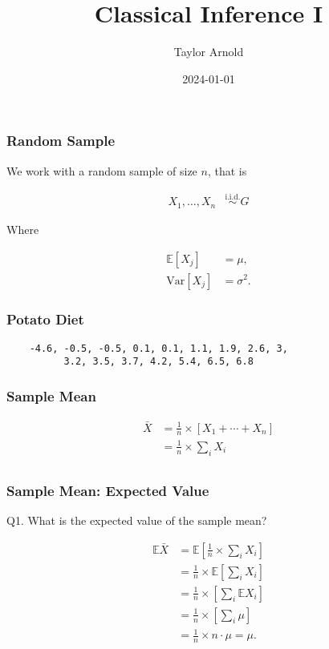 \documentclass{beamer}
\title{Classical Inference I}
\author{Taylor Arnold}
\date{2024-01-01}
\newcommand{\iid}{\overset{\mathrm{i.i.d.}}{\sim}}
\newcommand{\E}{\mathbb{E}}
\newcommand{\V}{\text{Var}}
\begin{document}
\frame{\titlepage}


\begin{frame}
\frametitle{Random Sample}

We work with a random sample of size $n$, that is

\begin{align*}
X_1, \ldots, X_n &\iid G
\end{align*}

Where 

\begin{align*}
\E \left[ X_j \right] &= \mu, \\
\V \left[ X_j \right] &= \sigma^2.
\end{align*}

\end{frame}

\begin{frame}[fragile]
\frametitle{Potato Diet}

\begin{verbatim}
    -4.6, -0.5, -0.5, 0.1, 0.1, 1.1, 1.9, 2.6, 3,
          3.2, 3.5, 3.7, 4.2, 5.4, 6.5, 6.8
\end{verbatim}

\end{frame}


\begin{frame}
\frametitle{Sample Mean}

\begin{align*}
\bar{X} &= \frac{1}{n} \times \left[X_1 + \cdots + X_n \right] \\
&= \frac{1}{n} \times \sum_i X_i \\
\end{align*}

\end{frame}


\begin{frame}
\frametitle{Sample Mean: Expected Value}

Q1. What is the expected value of the sample mean? \pause

\begin{align*}
\E \bar{X} &= \E \left[ \frac{1}{n} \times \sum_i X_i \right] \\
&= \frac{1}{n} \times \E \left[ \sum_i X_i \right] \\
&= \frac{1}{n} \times \left[ \sum_i \E X_i \right] \\
&= \frac{1}{n} \times \left[ \sum_i \mu \right] \\
&= \frac{1}{n} \times n \cdot \mu = \mu.
\end{align*}

\end{frame}
\end{document}
